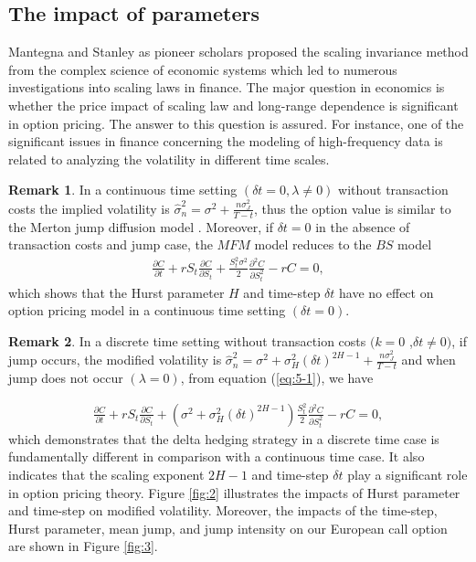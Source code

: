 \documentclass[a4paper,11pt]{amsart}
\numberwithin{equation}{section}
\theoremstyle{definition}
\theoremstyle{plain}
\theoremstyle{definition}
\newtheorem{rem}{Remark}[section]
\newcommand{\1}{\mathbf{1}}
\begin{document}
\subsection{The impact of parameters}


Mantegna and Stanley \cite{mantegna} as pioneer scholars proposed the scaling invariance method  from the complex science of economic
systems which led to numerous investigations into scaling laws in finance. The major question in economics is whether the price impact of scaling law and long-range dependence is significant in option pricing. The answer to this question is assured. For instance, one of the significant issues in finance concerning the modeling of high-frequency data is related to analyzing the volatility in different time scales.

\begin{rem} In a continuous time setting $(\delta t=0, \lambda\neq 0)$ without transaction costs the implied volatility is $\widehat{\sigma}_n^2=\sigma^2+\frac{n\sigma_J^2}{T-t}$, thus the option value is similar to the Merton jump diffusion model \cite{merton}. Moreover, if $\delta t=0$ in the absence of transaction costs and jump case, the $MFM$ model reduces to the $BS$ model
\begin{eqnarray}
\frac{\partial C}{\partial t}+rS_t\frac{\partial C}{\partial S_t}+\frac{S_t^2\sigma^2}{2}\frac{\partial^2 C}{\partial S_t^2}-rC=0,
\label{eq:11}
\end{eqnarray}
which shows that the Hurst parameter $H$  and time-step $\delta t$ have no effect on option pricing model in a continuous time setting $(\delta t=0)$.
\end{rem}

\begin{rem} In a discrete time setting without transaction costs $(k=0$ ,$\delta t\neq0)$, if jump occurs, the modified volatility is $\widehat{\sigma}_n^2=\sigma^2+\sigma_H^2(\delta t)^{2H-1}+\frac{n\sigma_J^2}{T-t}$  and when jump does not occur $(\lambda=0)$, from equation (\ref{eq:5-1}), we have

\begin{eqnarray}
\frac{\partial C}{\partial t}+rS_t\frac{\partial C}{\partial S_t}+(\sigma^2+\sigma_H^2 (\delta t)^{2H-1})\frac{S_t^2}{2}\frac{\partial^2 C}{\partial S_t^2}-rC=0,
\label{eq:11}
\end{eqnarray}
which demonstrates that the delta hedging strategy in a discrete time case is fundamentally different in comparison with a continuous time case. It also indicates that the scaling  exponent $2H-1$  and time-step $\delta t$ play a significant role in option pricing theory. Figure \ref{fig:2} illustrates the impacts of Hurst parameter and time-step on modified volatility. Moreover, the impacts of the time-step, Hurst parameter, mean jump, and jump intensity on our European call option are shown in Figure \ref{fig:3}.
\end{rem}
\end{document}
